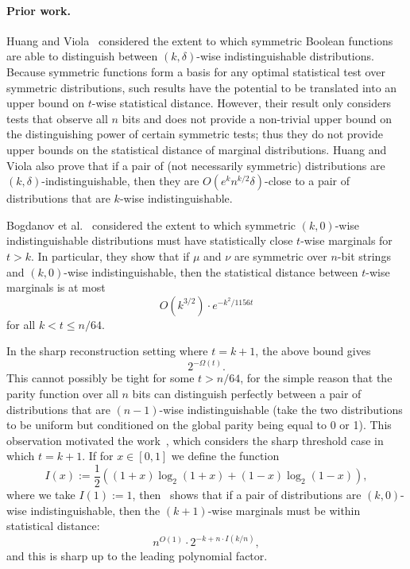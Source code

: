 \documentclass[manuscript,nonacm]{acmart}
\begin{document}
\paragraph{Prior work.}
Huang and Viola~\cite{huang2022approximate} considered
the extent to which symmetric Boolean functions are able to distinguish between $(k,\delta)$-wise indistinguishable distributions. Because symmetric functions form a basis for any optimal statistical test over symmetric distributions, such results have the potential to be translated into an upper bound on $t$-wise statistical distance. However, their result only considers tests that observe all $n$ bits and does not provide a non-trivial upper bound on the distinguishing power of certain symmetric tests; thus they do not provide upper bounds on the statistical distance of marginal distributions. Huang and Viola also prove that if a pair of (not necessarily symmetric) distributions are \((k,\delta)\)-indistinguishable, then they are
\(O\!\left(e^k n^{k/2}\delta\right)\)-close to a pair of distributions that are \(k\)-wise indistinguishable.


Bogdanov et al.~\cite{bogdanov2019approximate} considered
the extent to which symmetric $(k,0)$-wise indistinguishable distributions must
have statistically close $t$-wise marginals for $t>k$. In particular, they show that if $\mu$ and $\nu$ are symmetric over $n$-bit
strings and $(k,0)$-wise indistinguishable, then the statistical
distance between $t$-wise marginals is at most
\begin{equation}
\label{eq:BMTW19}
    O(k^{3/2}) \cdot e^{-k^2/1156t}
\end{equation}
for all $k<t\leq n/64$.

In the sharp reconstruction setting where $t=k+1$, the above bound gives
\[
2^{-\Omega(t)}.
\]
This cannot possibly be tight for some $t>n/64$, for the simple reason that the parity function over all $n$ bits can distinguish perfectly between a pair of distributions that are $(n-1)$-wise indistinguishable (take the two distributions to be uniform but conditioned on the global parity being equal to 0 or 1). This observation motivated the work~\cite{williamson2021sharp}, which considers the sharp threshold case in which $t=k+1$. If for $x\in[0,1]$ we define the function 
\[
I(x):=\frac12\left((1+x)\log_2(1+x)+(1-x)\log_2(1-x)\right),
\]
where we take $I(1):=1$, then~\cite{williamson2021sharp} shows that if a pair of distributions are $(k,0)$-wise indistinguishable, then the $(k+1)$-wise marginals must be within statistical distance:
\begin{equation}
\label{eq:Wil22}
    n^{O(1)}\cdot 2^{-k+n\cdot I(k/n)},
\end{equation}
and this is sharp up to the leading polynomial factor.
\end{document}
